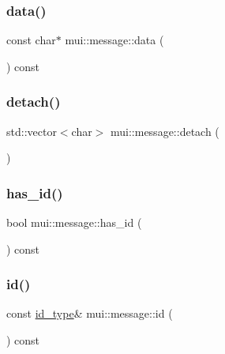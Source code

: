 \subsubsection{\texorpdfstring{data()}{data()}}
{\footnotesize\ttfamily const char$\ast$ mui\+::message\+::data (\begin{DoxyParamCaption}{ }\end{DoxyParamCaption}) const\hspace{0.3cm}{\ttfamily [inline]}}

\mbox{\label{structmui_1_1message_a91eb72d60f7eeb165a83b9c42a898ec5}} 
\subsubsection{\texorpdfstring{detach()}{detach()}}
{\footnotesize\ttfamily std\+::vector$<$char$>$ mui\+::message\+::detach (\begin{DoxyParamCaption}{ }\end{DoxyParamCaption})\hspace{0.3cm}{\ttfamily [inline]}}

\mbox{\label{structmui_1_1message_a7c5987da00691f40c4b4b6eaf979e19e}} 
\subsubsection{\texorpdfstring{has\+\_\+id()}{has\_id()}}
{\footnotesize\ttfamily bool mui\+::message\+::has\+\_\+id (\begin{DoxyParamCaption}{ }\end{DoxyParamCaption}) const\hspace{0.3cm}{\ttfamily [inline]}}

\mbox{\label{structmui_1_1message_a15b328d568653630c8665c1d0135cbd7}} 
\subsubsection{\texorpdfstring{id()}{id()}}
{\footnotesize\ttfamily const \hyperlink{structmui_1_1message_aecbd0ac37983ce799121a1d78d97a9c1}{id\+\_\+type}\& mui\+::message\+::id (\begin{DoxyParamCaption}{ }\end{DoxyParamCaption}) const\hspace{0.3cm}{\ttfamily [inline]}}

